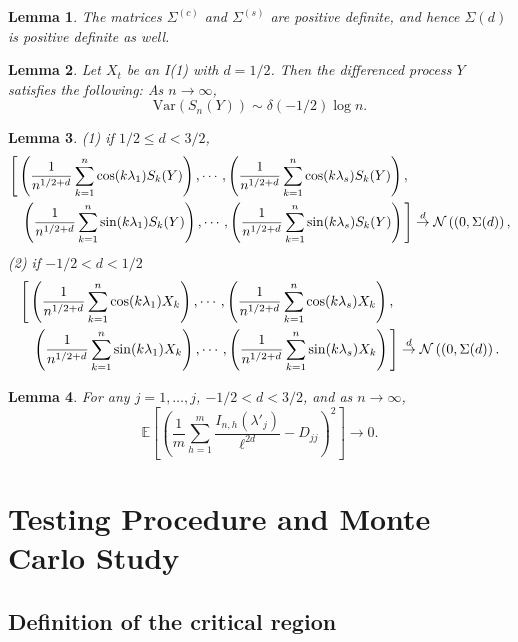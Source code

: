 \documentclass[12pt]{article}
\newtheorem{lem}{Lemma}
\begin{document}
\begin{lem}\label{invertible}
The matrices $\Sigma^{(c)}$ and $\Sigma^{(s)}$ are positive definite, and hence $\Sigma(d)$ is positive definite as well.
\end{lem}
\begin{lem} \label{unit root} Let $X_t$ be an I(1) with $d=1/2$. Then the differenced process $Y$ satisfies the following:  As $n\to\infty$,
   $$
   \textrm{Var}(S_n(Y))\sim \delta(-1/2)\log n.
   $$ 
\end{lem}
\begin{lem}\label{finite dim} 
(1)  if $1/2\le d<3/2$,
\begin{eqnarray*}\lefteqn{
\Bigg[\left(\frac{1}{n^{1/2+d}}\sum_{k=1}^n\cos(k\lambda_{1})S_k(Y)\right),
\cdots,\left(\frac{1}{n^{1/2+d}}\sum_{k=1}^n\cos(k\lambda_{s})S_k(Y)\right),}\\
&& \left(\frac{1}{n^{1/2+d}}\sum_{k=1}^n\sin(k\lambda_1)S_k(Y)\right),\cdots,\left(\frac{1}{n^{1/2+d}}\sum_{k=1}^n\sin(k\lambda_{s})S_k(Y)\right)\Bigg]\overset{d}{\rightarrow}\mathcal{N}\left((0,\Sigma(d)\right), \nonumber
\end{eqnarray*}
(2) if $-1/2<d<1/2$
\begin{eqnarray*}\lefteqn{
\Bigg[\left(\frac{1}{n^{1/2+d}}\sum_{k=1}^n\cos(k\lambda_{1})X_k\right),
\cdots,\left(\frac{1}{n^{1/2+d}}\sum_{k=1}^n\cos(k\lambda_{s})X_k\right),}\nonumber\\
&& \left(\frac{1}{n^{1/2+d}}\sum_{k=1}^n\sin(k\lambda_1)X_k\right),\cdots,\left(\frac{1}{n^{1/2+d}}\sum_{k=1}^n\sin(k\lambda_{s})X_k\right)\Bigg]\overset{d}{\rightarrow}\mathcal{N}\left((0,\Sigma(d)\right). 
\end{eqnarray*}
\end{lem}
\begin{lem} \label{denom} For any $j=1,\ldots,j$, $-1/2<d<3/2$, and as $n\to\infty$,
\begin{equation}\label{mena limit}
\mathbb{E}\left[\left(\frac{1}{m}\sum_{h=1}^m\frac{I_{n,h}(\lambda'_j)}{\ell^{2d}}-D_{jj}\right)^2\right]\to 0.
\end{equation}
\end{lem}
\section{Testing Procedure and Monte Carlo Study }\label{simulation}

\subsection{Definition of the critical region }
\end{document}
